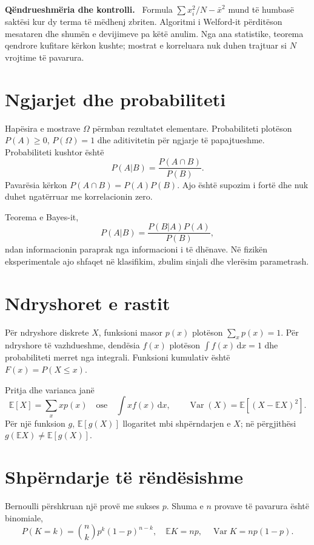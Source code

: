 \documentclass[11pt,oneside,openany]{book}
\newcommand{\E}{\mathbb{E}}
\newcommand{\Var}{\operatorname{Var}}
\newcommand{\dd}{\,\mathrm{d}}
\newenvironment{qendrueshmeri}{\par\medskip\noindent\textbf{Qëndrueshmëria dhe kontrolli.}\ }{\par\medskip}
\begin{document}
\begin{qendrueshmeri}
Formula $\sum x_i^2/N-\bar x^2$ mund të humbasë saktësi kur dy terma të mëdhenj
zbriten. Algoritmi i Welford-it përditëson mesataren dhe shumën e devijimeve
pa këtë anulim. Nga ana statistike, teorema qendrore kufitare kërkon kushte;
mostrat e korreluara nuk duhen trajtuar si $N$ vrojtime të pavarura.
\end{qendrueshmeri}



\section{Ngjarjet dhe probabiliteti}
Hapësira e mostrave $\Omega$ përmban rezultatet elementare. Probabiliteti plotëson $P(A)\ge0$, $P(\Omega)=1$ dhe aditivitetin për ngjarje të papajtueshme. Probabiliteti kushtor është
\begin{equation}
 P(A|B)=\frac{P(A\cap B)}{P(B)}.
\end{equation}
Pavarësia kërkon $P(A\cap B)=P(A)P(B)$. Ajo është supozim i fortë dhe nuk duhet ngatërruar me korrelacionin zero.

Teorema e Bayes-it,
\begin{equation}
 P(A|B)=\frac{P(B|A)P(A)}{P(B)},
\end{equation}
ndan informacionin paraprak nga informacioni i të dhënave. Në fizikën eksperimentale ajo shfaqet në klasifikim, zbulim sinjali dhe vlerësim parametrash.

\section{Ndryshoret e rastit}
Për ndryshore diskrete $X$, funksioni masor $p(x)$ plotëson $\sum_xp(x)=1$. Për ndryshore të vazhdueshme, dendësia $f(x)$ plotëson $\int f(x)\dd x=1$ dhe probabiliteti merret nga integrali. Funksioni kumulativ është $F(x)=P(X\le x)$.

Pritja dhe varianca janë
\begin{equation}
 \E[X]=\sum_xxp(x)\quad\text{ose}\quad\int xf(x)\dd x,
 \qquad \Var(X)=\E[(X-\E X)^2].
\end{equation}
Për një funksion $g$, $\E[g(X)]$ llogaritet mbi shpërndarjen e $X$; në përgjithësi $g(\E X)\ne\E[g(X)]$.

\section{Shpërndarje të rëndësishme}
Bernoulli përshkruan një provë me sukses $p$. Shuma e $n$ provave të pavarura është binomiale,
\begin{equation}
 P(K=k)=\binom nk p^k(1-p)^{n-k},\quad \E K=np,\quad \Var K=np(1-p).
\end{equation}
\end{document}
